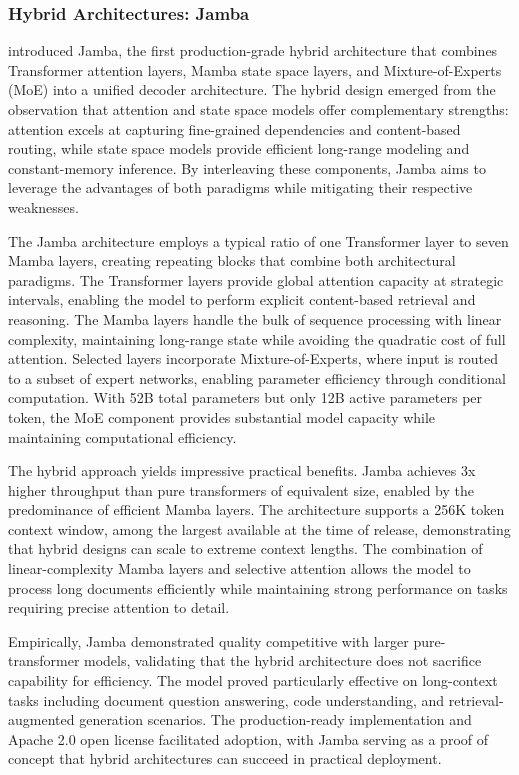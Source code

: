 \documentclass[11pt,letterpaper]{article}
\begin{document}
\subsubsection{Hybrid Architectures: Jamba}

\cite{lieber2024jamba} introduced Jamba, the first production-grade hybrid architecture that combines Transformer attention layers, Mamba state space layers, and Mixture-of-Experts (MoE) into a unified decoder architecture. The hybrid design emerged from the observation that attention and state space models offer complementary strengths: attention excels at capturing fine-grained dependencies and content-based routing, while state space models provide efficient long-range modeling and constant-memory inference. By interleaving these components, Jamba aims to leverage the advantages of both paradigms while mitigating their respective weaknesses.

The Jamba architecture employs a typical ratio of one Transformer layer to seven Mamba layers, creating repeating blocks that combine both architectural paradigms. The Transformer layers provide global attention capacity at strategic intervals, enabling the model to perform explicit content-based retrieval and reasoning. The Mamba layers handle the bulk of sequence processing with linear complexity, maintaining long-range state while avoiding the quadratic cost of full attention. Selected layers incorporate Mixture-of-Experts, where input is routed to a subset of expert networks, enabling parameter efficiency through conditional computation. With 52B total parameters but only 12B active parameters per token, the MoE component provides substantial model capacity while maintaining computational efficiency.

The hybrid approach yields impressive practical benefits. Jamba achieves 3x higher throughput than pure transformers of equivalent size, enabled by the predominance of efficient Mamba layers. The architecture supports a 256K token context window, among the largest available at the time of release, demonstrating that hybrid designs can scale to extreme context lengths. The combination of linear-complexity Mamba layers and selective attention allows the model to process long documents efficiently while maintaining strong performance on tasks requiring precise attention to detail.

Empirically, Jamba demonstrated quality competitive with larger pure-transformer models, validating that the hybrid architecture does not sacrifice capability for efficiency. The model proved particularly effective on long-context tasks including document question answering, code understanding, and retrieval-augmented generation scenarios. The production-ready implementation and Apache 2.0 open license facilitated adoption, with Jamba serving as a proof of concept that hybrid architectures can succeed in practical deployment.
\end{document}
